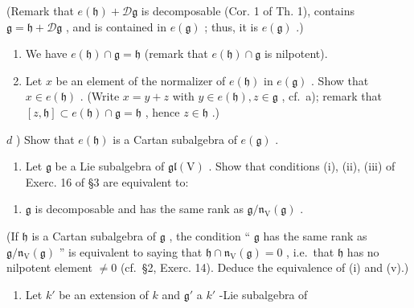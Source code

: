(Remark that \(e(\mathfrak{h}) + \mathcal{D}\mathfrak{g}\) is decomposable (Cor. 1 of Th. 1), contains \(\mathfrak{g} = \mathfrak{h} + \mathcal{D}\mathfrak{g}\) , and is contained in \(e(\mathfrak{g})\) ; thus, it is \(e(\mathfrak{g})\) .)

\begin{enumerate}
\def\labelenumi{\alph{enumi})}
\setcounter{enumi}{1}
\item
  We have \(e(\mathfrak{h}) \cap \mathfrak{g} = \mathfrak{h}\) (remark that \(e(\mathfrak{h}) \cap \mathfrak{g}\) is nilpotent).
\item
  Let \(x\) be an element of the normalizer of \(e(\mathfrak{h})\) in \(e(\mathfrak{g})\) . Show that \(x \in e(\mathfrak{h})\) . (Write \(x = y + z\) with \(y \in e(\mathfrak{h}), z \in \mathfrak{g}\) , cf.~a); remark that \([z, \mathfrak{h}] \subset e(\mathfrak{h}) \cap \mathfrak{g} = \mathfrak{h}\) , hence \(z \in \mathfrak{h}\) .)
\end{enumerate}

\(d\) ) Show that \(e(\mathfrak{h})\) is a Cartan subalgebra of \(e(\mathfrak{g})\) .

\begin{enumerate}
\def\labelenumi{\arabic{enumi})}
\setcounter{enumi}{8}
\tightlist
\item
  Let \(\mathfrak{g}\) be a Lie subalgebra of \(\mathfrak{gl}(\mathrm{V})\) . Show that conditions (i), (ii), (iii) of Exerc. 16 of §3 are equivalent to:
\end{enumerate}

\begin{enumerate}
\def\labelenumi{(\alph{enumi})}
\setcounter{enumi}{21}
\tightlist
\item
  \(\mathfrak{g}\) is decomposable and has the same rank as \(\mathfrak{g} / \mathfrak{n}_{\mathrm{V}}(\mathfrak{g})\) .
\end{enumerate}

(If \(\mathfrak{h}\) is a Cartan subalgebra of \(\mathfrak{g}\) , the condition `` \(\mathfrak{g}\) has the same rank as \(\mathfrak{g}/\mathfrak{n}_{\mathrm{V}}(\mathfrak{g})\) '' is equivalent to saying that \(\mathfrak{h} \cap \mathfrak{n}_{\mathrm{V}}(\mathfrak{g}) = 0\) , i.e.~that \(\mathfrak{h}\) has no nilpotent element \(\neq 0\) (cf.~§2, Exerc. 14). Deduce the equivalence of (i) and (v).)

\begin{enumerate}
\def\labelenumi{\arabic{enumi})}
\setcounter{enumi}{9}
\tightlist
\item
  Let \(k'\) be an extension of \(k\) and \(\mathfrak{g}'\) a \(k'\) -Lie subalgebra of
\end{enumerate}

